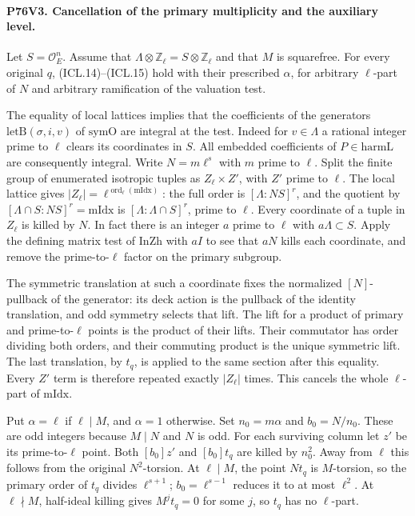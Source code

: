 \paragraph{P76V3. Cancellation of the primary multiplicity and the auxiliary level.}
Let $S=\mathcal O_E^n$. Assume that
$\Lambda\otimes\mathbb Z_\ell=S\otimes\mathbb Z_\ell$ and that
$M$ is squarefree. For every original $q$, (ICL.14)--(ICL.15)
hold with their prescribed $\alpha$, for arbitrary $\ell$-part of
$N$ and arbitrary ramification of the valuation test.

The equality of local lattices implies that the coefficients of
the generators $\mathrm{letB}(\sigma,i,v)$ of $\mathrm{symO}$
are integral at the test. Indeed for $v\in\Lambda$ a rational
integer prime to $\ell$ clears its coordinates in $S$. All
embedded coefficients of $P\in\mathrm{harmL}$ are consequently
integral. Write $N=m\ell^s$ with $m$ prime to $\ell$. Split the
finite group of enumerated isotropic tuples as $Z_\ell\times Z'$,
with $Z'$ prime to $\ell$. The local lattice gives
$|Z_\ell|=\ell^{\operatorname{ord}_\ell(\mathrm{mIdx})}$:
the full order is $[\Lambda:NS]^r$, and the quotient by
$[\Lambda\cap S:NS]^r=\mathrm{mIdx}$ is
$[\Lambda:\Lambda\cap S]^r$, prime to $\ell$. Every coordinate
of a tuple in $Z_\ell$ is killed by $N$. In fact there is an
integer $a$ prime to $\ell$ with $a\Lambda\subset S$. Apply
the defining matrix test of $\mathrm{InZh}$ with $aI$ to see
that $aN$ kills each coordinate, and remove the prime-to-$\ell$
factor on the primary subgroup.

The symmetric translation at such a coordinate fixes the
normalized $[N]$-pullback of the generator: its deck action is
the pullback of the identity translation, and odd symmetry
selects that lift. The lift for a product of primary and
prime-to-$\ell$ points is the product of their lifts. Their
commutator has order dividing both orders, and their commuting
product is the unique symmetric lift. The last translation, by
$t_q$, is applied to the same section after this equality.
Every $Z'$ term is therefore repeated exactly $|Z_\ell|$ times.
This cancels the whole $\ell$-part of $\mathrm{mIdx}$.

Put $\alpha=\ell$ if $\ell\mid M$, and $\alpha=1$ otherwise.
Set $n_0=m\alpha$ and $b_0=N/n_0$. These are odd integers
because $M\mid N$ and $N$ is odd. For each surviving column
let $z'$ be its prime-to-$\ell$ point. Both $[b_0]z'$ and
$[b_0]t_q$ are killed by $n_0^2$. Away from $\ell$ this follows
from the original $N^2$-torsion. At $\ell\mid M$, the point
$Nt_q$ is $M$-torsion, so the primary order of $t_q$ divides
$\ell^{s+1}$; $b_0=\ell^{s-1}$ reduces it to at most $\ell^2$.
At $\ell\nmid M$, half-ideal killing gives $M^j t_q=0$ for
some $j$, so $t_q$ has no $\ell$-part.

